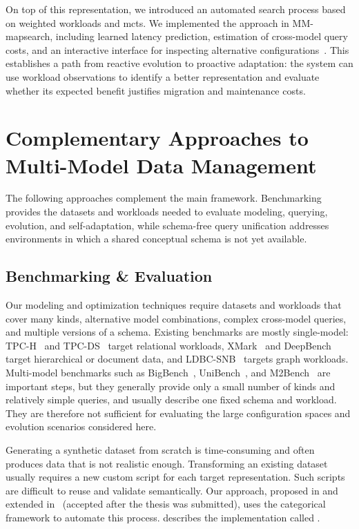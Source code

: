 On top of this representation, we introduced an automated search process based on weighted workloads and \acrshort{mcts}. We implemented the approach in MM-mapsearch, including learned latency prediction, estimation of cross-model query costs, and an interactive interface for inspecting alternative configurations~. This establishes a path from reactive evolution to proactive adaptation: the system can use workload observations to identify a better representation and evaluate whether its expected benefit justifies migration and maintenance costs.


\section{Complementary Approaches to Multi-Model Data Management}

The following approaches complement the main framework. Benchmarking provides the datasets and workloads needed to evaluate modeling, querying, evolution, and self-adaptation, while schema-free query unification addresses environments in which a shared conceptual schema is not yet available.

\subsection{Benchmarking \& Evaluation}

Our modeling and optimization techniques require datasets and workloads that cover many kinds, alternative model combinations, complex cross-model queries, and multiple versions of a schema. Existing benchmarks are mostly single-model: TPC-H~\citep{tpch} and TPC-DS~\citep{tpcds} target relational workloads, XMark~\citep{10.5555/1287369.1287455} and DeepBench~\citep{10.1145/3531348.3532176} target hierarchical or document data, and LDBC-SNB~\citep{10.1145/2723372.2742786} targets graph workloads. Multi-model benchmarks such as BigBench~\citep{10.1145/2463676.2463712}, UniBench~\citep{unibench}, and M2Bench~\citep{10.14778/3574245.3574259} are important steps, but they generally provide only a small number of kinds and relatively simple queries, and usually describe one fixed schema and workload. They are therefore not sufficient for evaluating the large configuration spaces and evolution scenarios considered here.

Generating a synthetic dataset from scratch is time-consuming and often produces data that is not realistic enough. Transforming an existing dataset usually requires a new custom script for each target representation. Such scripts are difficult to reuse and validate semantically. Our approach, proposed in  and extended in~\citep{is_2026} (accepted after the thesis was submitted), uses the categorical framework to automate this process.  describes the implementation called .

